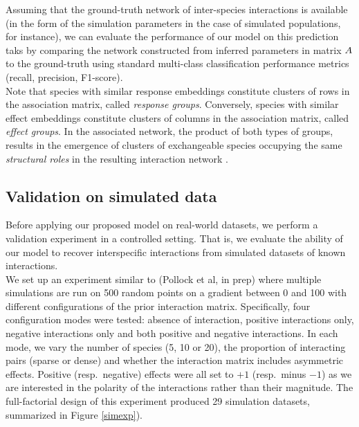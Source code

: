 \documentclass[10pt,a4paper]{article}
\begin{document}
Assuming that the ground-truth network of inter-species interactions is available (in the form of the simulation parameters in the case of simulated populations, for instance), we can evaluate the performance of our model on this prediction taks by comparing the network constructed from inferred parameters in matrix $A$ to the ground-truth using standard multi-class classification performance metrics (recall, precision, F1-score).\\

Note that species with similar response embeddings constitute clusters of rows in the association matrix, called \emph{response groups}. Conversely, species with similar effect embeddings constitute clusters of columns in the association matrix, called \textit{effect groups}. In the associated network, the product of both types of groups, results in the emergence of clusters of exchangeable species occupying the same \emph{structural roles} in the resulting interaction network \cite{gauzens2015trophic}. 


\subsection{Validation on simulated data}
Before applying our proposed model on real-world datasets, we perform a validation experiment in a controlled setting. That is, we evaluate the ability of our model to recover interspecific interactions from simulated datasets of known interactions.\\

We set up an experiment similar to (Pollock et al, in prep) where multiple simulations are run on 500 random points on a gradient between 0 and 100 with different configurations of the prior interaction matrix. Specifically, four configuration modes were tested: absence of interaction, positive interactions only, negative interactions only and both positive and negative interactions. In each mode, we vary the number of species (5, 10 or 20), the proportion of interacting pairs (sparse or dense) and whether the interaction matrix includes asymmetric effects. Positive (resp.\ negative) effects were all set to $+1$ (resp.\ minus $-1$) as we are interested in the polarity of the interactions rather than their magnitude. The full-factorial design of this experiment produced 29 simulation datasets, summarized in Figure \ref{simexp}).\\
\end{document}
